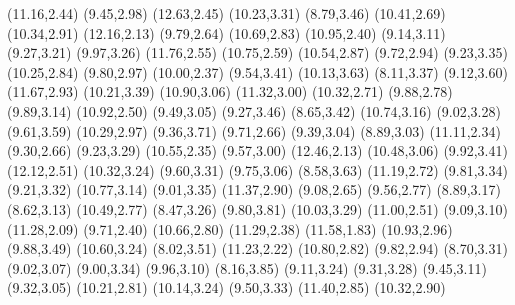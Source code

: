 \psdot[](11.16,2.44)
\psdot[](9.45,2.98)
\psdot[](12.63,2.45)
\psdot[](10.23,3.31)
\psdot[](8.79,3.46)
\psdot[](10.41,2.69)
\psdot[](10.34,2.91)
\psdot[](12.16,2.13)
\psdot[](9.79,2.64)
\psdot[](10.69,2.83)
\psdot[](10.95,2.40)
\psdot[](9.14,3.11)
\psdot[](9.27,3.21)
\psdot[](9.97,3.26)
\psdot[](11.76,2.55)
\psdot[](10.75,2.59)
\psdot[](10.54,2.87)
\psdot[](9.72,2.94)
\psdot[](9.23,3.35)
\psdot[](10.25,2.84)
\psdot[](9.80,2.97)
\psdot[](10.00,2.37)
\psdot[](9.54,3.41)
\psdot[](10.13,3.63)
\psdot[](8.11,3.37)
\psdot[](9.12,3.60)
\psdot[](11.67,2.93)
\psdot[](10.21,3.39)
\psdot[](10.90,3.06)
\psdot[](11.32,3.00)
\psdot[](10.32,2.71)
\psdot[](9.88,2.78)
\psdot[](9.89,3.14)
\psdot[](10.92,2.50)
\psdot[](9.49,3.05)
\psdot[](9.27,3.46)
\psdot[](8.65,3.42)
\psdot[](10.74,3.16)
\psdot[](9.02,3.28)
\psdot[](9.61,3.59)
\psdot[](10.29,2.97)
\psdot[](9.36,3.71)
\psdot[](9.71,2.66)
\psdot[](9.39,3.04)
\psdot[](8.89,3.03)
\psdot[](11.11,2.34)
\psdot[](9.30,2.66)
\psdot[](9.23,3.29)
\psdot[](10.55,2.35)
\psdot[](9.57,3.00)
\psdot[](12.46,2.13)
\psdot[](10.48,3.06)
\psdot[](9.92,3.41)
\psdot[](12.12,2.51)
\psdot[](10.32,3.24)
\psdot[](9.60,3.31)
\psdot[](9.75,3.06)
\psdot[](8.58,3.63)
\psdot[](11.19,2.72)
\psdot[](9.81,3.34)
\psdot[](9.21,3.32)
\psdot[](10.77,3.14)
\psdot[](9.01,3.35)
\psdot[](11.37,2.90)
\psdot[](9.08,2.65)
\psdot[](9.56,2.77)
\psdot[](8.89,3.17)
\psdot[](8.62,3.13)
\psdot[](10.49,2.77)
\psdot[](8.47,3.26)
\psdot[](9.80,3.81)
\psdot[](10.03,3.29)
\psdot[](11.00,2.51)
\psdot[](9.09,3.10)
\psdot[](11.28,2.09)
\psdot[](9.71,2.40)
\psdot[](10.66,2.80)
\psdot[](11.29,2.38)
\psdot[](11.58,1.83)
\psdot[](10.93,2.96)
\psdot[](9.88,3.49)
\psdot[](10.60,3.24)
\psdot[](8.02,3.51)
\psdot[](11.23,2.22)
\psdot[](10.80,2.82)
\psdot[](9.82,2.94)
\psdot[](8.70,3.31)
\psdot[](9.02,3.07)
\psdot[](9.00,3.34)
\psdot[](9.96,3.10)
\psdot[](8.16,3.85)
\psdot[](9.11,3.24)
\psdot[](9.31,3.28)
\psdot[](9.45,3.11)
\psdot[](9.32,3.05)
\psdot[](10.21,2.81)
\psdot[](10.14,3.24)
\psdot[](9.50,3.33)
\psdot[](11.40,2.85)
\psdot[](10.32,2.90)
